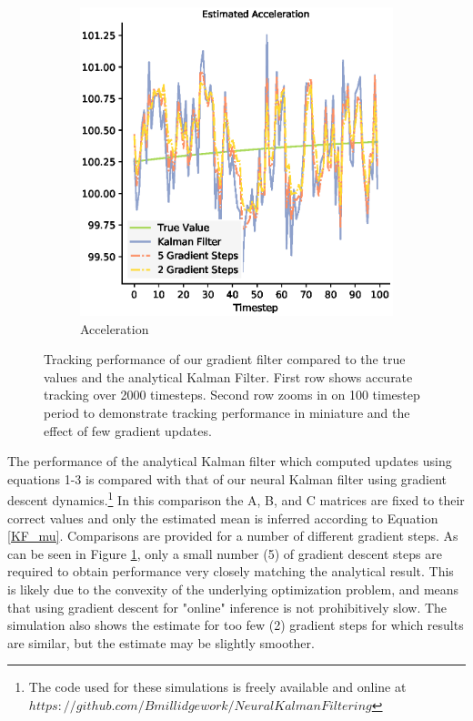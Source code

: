 \begin{figure}[H]
\begin{subfigure}{0.33\textwidth}
    \includegraphics[width=.8\linewidth]{chapter_3_figures/Estimated_Acceleration_NKF_zoomed.eps}
    \caption{Acceleration}
  \end{subfigure}
  \caption{Tracking performance of our gradient filter compared to the true values and the analytical Kalman Filter. First row shows accurate tracking over 2000 timesteps. Second row zooms in on 100 timestep period to demonstrate tracking performance in miniature and the effect of few gradient updates.}
  
\label{KF_tracking}
\end{figure}


The performance of the analytical Kalman filter which computed updates using equations 1-3 is compared with that of our neural Kalman filter using gradient descent dynamics.\footnote{The code used for these simulations is freely available and online at $https://github.com/Bmillidgework/NeuralKalmanFiltering$} In this comparison the A, B, and C matrices are fixed to their correct values and only the estimated mean is inferred according to Equation \ref{KF_mu}. Comparisons are provided for a number of different gradient steps. As can be seen in Figure \ref{KF_tracking}, only a small number (5) of gradient descent steps are required to obtain performance very closely matching the analytical result. This is likely due to the convexity of the underlying optimization problem, and means that using gradient descent for "online" inference is not prohibitively slow. The simulation also shows the estimate for too few (2) gradient steps for which results are similar, but the estimate may be slightly smoother.

